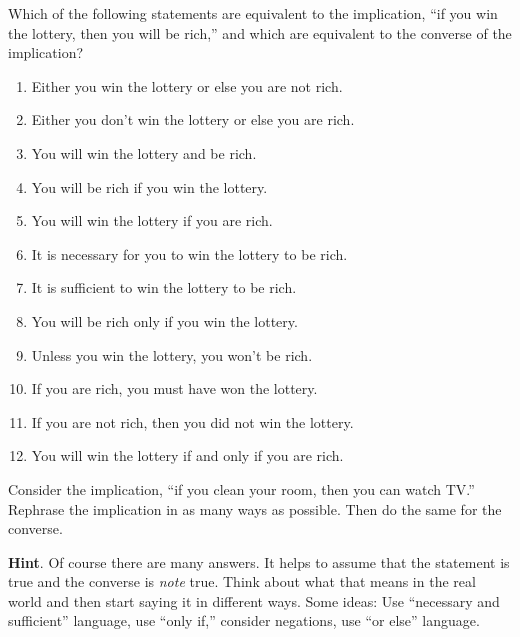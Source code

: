 \documentclass[10pt,]{book}
\theoremstyle{plain}
\theoremstyle{definition}
\theoremstyle{definition}
\theoremstyle{definition}
\theoremstyle{definition}
\numberwithin{equation}{chapter}
\begin{document}
\begin{divisionexercise}{5}\hypertarget{exercise-181}{}
\hypertarget{p-1495}{}%
Which of the following statements are equivalent to the implication, ``if you win the lottery, then you will be rich,'' and which are equivalent to the converse of the implication?%
\leavevmode%
\begin{enumerate}[label=(\alph*)]
\item\hypertarget{li-357}{}\hypertarget{p-1496}{}%
Either you win the lottery or else you are not rich.%
\item\hypertarget{li-358}{}\hypertarget{p-1497}{}%
Either you don't win the lottery or else you are rich.%
\item\hypertarget{li-359}{}\hypertarget{p-1498}{}%
You will win the lottery and be rich.%
\item\hypertarget{li-360}{}\hypertarget{p-1499}{}%
You will be rich if you win the lottery.%
\item\hypertarget{li-361}{}\hypertarget{p-1500}{}%
You will win the lottery if you are rich.%
\item\hypertarget{li-362}{}\hypertarget{p-1501}{}%
It is necessary for you to win the lottery to be rich.%
\item\hypertarget{li-363}{}\hypertarget{p-1502}{}%
It is sufficient to win the lottery to be rich.%
\item\hypertarget{li-364}{}\hypertarget{p-1503}{}%
You will be rich only if you win the lottery.%
\item\hypertarget{li-365}{}\hypertarget{p-1504}{}%
Unless you win the lottery, you won't be rich.%
\item\hypertarget{li-366}{}\hypertarget{p-1505}{}%
If you are rich, you must have won the lottery.%
\item\hypertarget{li-367}{}\hypertarget{p-1506}{}%
If you are not rich, then you did not win the lottery.%
\item\hypertarget{li-368}{}\hypertarget{p-1507}{}%
You will win the lottery if and only if you are rich.%
\end{enumerate}
\end{divisionexercise}%
\begin{divisionexercise}{6}\hypertarget{exercise-182}{}
\hypertarget{p-1521}{}%
Consider the implication, ``if you clean your room, then you can watch TV.'' Rephrase the implication in as many ways as possible. Then do the same for the converse.%
\par\smallskip%
\noindent\textbf{Hint}.\hypertarget{hint-91}{}\quad%
\hypertarget{p-1522}{}%
Of course there are many answers. It helps to assume that the statement is true and the converse is \emph{note} true. Think about what that means in the real world and then start saying it in different ways. Some ideas: Use ``necessary and sufficient'' language, use ``only if,'' consider negations, use ``or else'' language.%
\end{divisionexercise}%
\end{document}
